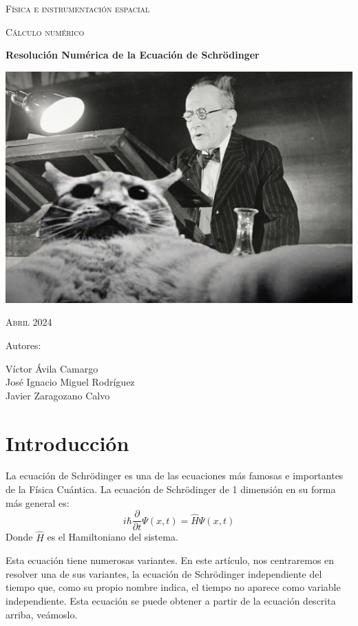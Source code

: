 \documentclass[12pt]{article}
\begin{document}


\begin{titlepage}
\begin{center}
{\scshape\huge Física e instrumentación espacial \par}
\vspace{1cm}
{\scshape\Large Cálculo numérico \par}
\vspace{1cm}
{\textbf{{\Huge Resolución Numérica de la Ecuación de Schrödinger}} \par}
\vspace{1.5cm}
{\includegraphics[scale=0.8]{portada.jpg}\par}
\vspace{1cm}
{\scshape\Large Abril 2024 \par}
\vspace{1.5cm}
\end{center}
\begin{flushleft}
{\Large Autores: \par}
{\Large 
Víctor Ávila Camargo\\
José Ignacio Miguel Rodríguez\\
Javier Zaragozano Calvo \par
}
\end{flushleft}
\end{titlepage}

\tableofcontents
\newpage	

\section{Introducción}
La ecuación de Schrödinger es una de las ecuaciones más famosas
e importantes de la Física Cuántica. La ecuación de Schrödinger de 1
dimensión en su forma más general es: 
\begin{equation}
i\hbar \frac{\partial}{\partial t}\Psi (x,t)=\hat{H} \Psi (x,t)
\end{equation}
Donde $\hat{H}$ es el Hamiltoniano del sistema. \\
\par
Esta ecuación tiene numerosas variantes. En este artículo, nos 
centraremos en resolver una de sus variantes, la ecuación de Schrödinger
independiente del tiempo que, como su propio nombre indica, el tiempo
no aparece como variable independiente. Esta ecuación se puede obtener a partir de la ecuación descrita arriba, veámoslo.
\end{document}
